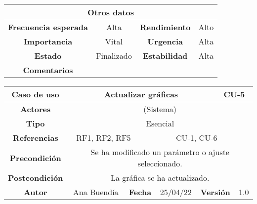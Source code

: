 \begin{table}[!h]
\begin{tabular}{|c|c|c|c|}
\hline
\multicolumn{4}{|c|}{\cellcolor{cyan} \textbf{Otros datos}} \\
\hline
 \cellcolor{cyan} \textbf{Frecuencia esperada}             &      Alta         &    \cellcolor{cyan} \textbf{Rendimiento}          &      Alto        \\
\hline
 \cellcolor{cyan} \textbf{Importancia}             &       Vital        &     \cellcolor{cyan} \textbf{Urgencia}         &      Alta        \\
\hline
 \cellcolor{cyan} \textbf{Estado}             &       Finalizado        &    \cellcolor{cyan} \textbf{Estabilidad}          &      Alta        \\
\hline
 \cellcolor{cyan} \textbf{Comentarios}        &  \multicolumn{3}{|c|}{} \\
\hline
\end{tabular}
\end{table}





\clearpage

\begin{table}[!h]
\begin{tabular}{|c|c|c|c|c|c|c|c|}
\hline
\rowcolor{cyan} \textbf{Caso de uso} & \multicolumn{5}{|c|}{Actualizar gráficas} & \multicolumn{2}{|c|}{CU-5} \\
\hline
\cellcolor{cyan} \textbf{Actores}              & \multicolumn{7}{|c|}{(Sistema)}           \\
\hline
\cellcolor{cyan} \textbf{Tipo}                 & \multicolumn{7}{|c|}{Esencial}             \\
\hline
\cellcolor{cyan} \textbf{Referencias}          & \multicolumn{2}{|c|}{RF1, RF2, RF5}           & \multicolumn{5}{|c|}{CU-1, CU-6}\\
\hline
\cellcolor{cyan} \textbf{Precondición}         & \multicolumn{7}{|c|}{Se ha modificado un parámetro o ajuste seleccionado.}             \\
\hline
\cellcolor{cyan} \textbf{Postcondición}        & \multicolumn{7}{|c|}{La gráfica se ha actualizado.}              \\
\hline
\cellcolor{cyan} \textbf{Autor}                &   Ana Buendía   & \multicolumn{2}{|c|}{\cellcolor{cyan} \textbf{Fecha}} &  25/04/22   & \multicolumn{2}{|c|}{\cellcolor{cyan} \textbf{Versión}} & 1.0  \\
\hline
\end{tabular}
\end{table}

